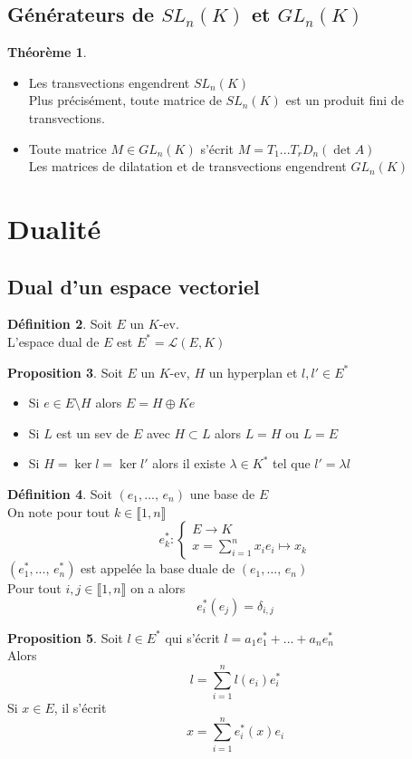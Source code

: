 \documentclass[10pt,a4paper]{article}
\theoremstyle{definition}
\newtheorem{proposition}{Proposition}[section]
\newtheorem{theorem}[proposition]{Théorème}
\newtheorem{definition}[proposition]{Définition}
\begin{document}
\subsection{Générateurs de $SL_n(K)$ et $GL_n(K)$}
\begin{theorem}
\hfill
\begin{itemize}
\item Les transvections engendrent $SL_n(K)$ \\
Plus précisément, toute matrice de $SL_n(K)$ est un produit fini de transvections.
\item Toute matrice $M \in GL_n(K)$ s'écrit $M = T_1 ... T_r D_n(\det A)$ \\
Les matrices de dilatation et de transvections engendrent $GL_n(K)$
\end{itemize}
\end{theorem}

\section{Dualité}
\subsection{Dual d'un espace vectoriel}
\begin{definition}
Soit $E$ un $K$-ev. \\
L'espace dual de $E$ est $E^* = \mathcal{L}(E, K)$
\end{definition}
\begin{proposition}
Soit $E$ un $K$-ev, $H$ un hyperplan et $l, l' \in E^*$
\begin{itemize}
\item Si $e \in E \setminus H$ alors $E = H \oplus Ke$
\item Si $L$ est un sev de $E$ avec $H \subset L$ alors $L = H$ ou $L = E$
\item Si $H = \ker l = \ker l'$ alors il existe $\lambda \in K^*$ tel que $l' = \lambda l$
\end{itemize}
\end{proposition}
\begin{definition}
Soit $(e_1, ...,\, e_n)$ une base de $E$ \\
On note pour tout $k \in \llbracket 1, n \rrbracket$
\[ e_k^* : \begin{cases}
E \to K \\
x = \sum\limits_{i = 1}^n x_i e_i \mapsto x_k
\end{cases} \]
$(e_1^*, ...,\, e_n^*)$ est appelée la base duale de $(e_1, ...,\, e_n)$ \\
Pour tout $i, j \in \llbracket 1, n \rrbracket$ on a alors
\[ e_i^*(e_j) = \delta_{i, j} \]
\end{definition}
\begin{proposition}
Soit $l \in E^*$ qui s'écrit $l = a_1 e_1^* + ... + a_n e_n^*$ \\
Alors
\[ l = \sum_{i = 1}^n l(e_i) e_i^* \]
Si $x \in E$, il s'écrit
\[ x = \sum_{i = 1}^n e_i^*(x) e_i \]
\end{proposition}
\end{document}
